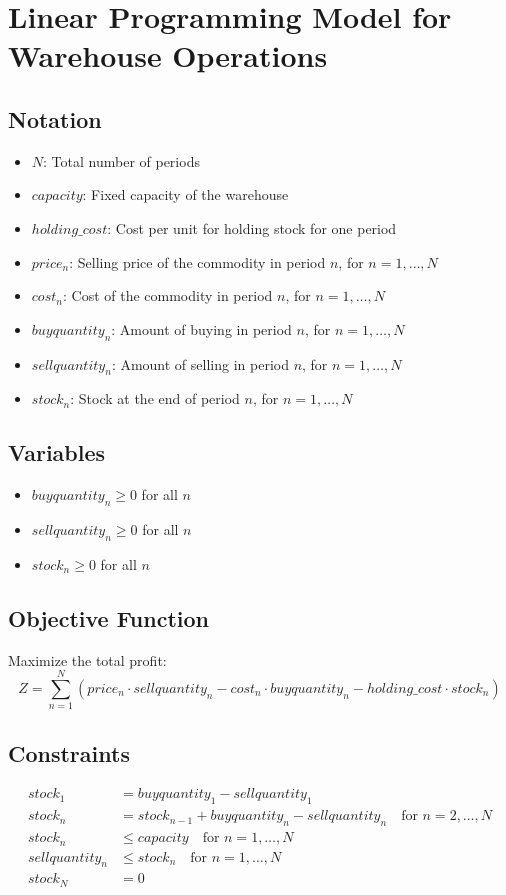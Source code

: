 \documentclass{article}
\begin{document}
\section*{Linear Programming Model for Warehouse Operations}

\subsection*{Notation}
\begin{itemize}
    \item $N$: Total number of periods
    \item $capacity$: Fixed capacity of the warehouse
    \item $holding\_cost$: Cost per unit for holding stock for one period
    \item $price_n$: Selling price of the commodity in period $n$, for $n = 1, \ldots, N$
    \item $cost_n$: Cost of the commodity in period $n$, for $n = 1, \ldots, N$
    \item $buyquantity_n$: Amount of buying in period $n$, for $n = 1, \ldots, N$
    \item $sellquantity_n$: Amount of selling in period $n$, for $n = 1, \ldots, N$
    \item $stock_n$: Stock at the end of period $n$, for $n = 1, \ldots, N$
\end{itemize}

\subsection*{Variables}
\begin{itemize}
    \item $buyquantity_n \geq 0$ for all $n$
    \item $sellquantity_n \geq 0$ for all $n$
    \item $stock_n \geq 0$ for all $n$
\end{itemize}

\subsection*{Objective Function}
Maximize the total profit:
\[
Z = \sum_{n=1}^{N} \left( price_n \cdot sellquantity_n - cost_n \cdot buyquantity_n - holding\_cost \cdot stock_n \right)
\]

\subsection*{Constraints}
\begin{align}
    stock_1 & = buyquantity_1 - sellquantity_1 \\
    stock_n & = stock_{n-1} + buyquantity_n - sellquantity_n \quad \text{for } n = 2, \ldots, N \\
    stock_n & \leq capacity \quad \text{for } n = 1, \ldots, N \\
    sellquantity_n & \leq stock_n \quad \text{for } n = 1, \ldots, N \\
    stock_N & = 0
\end{align}
\end{document}
